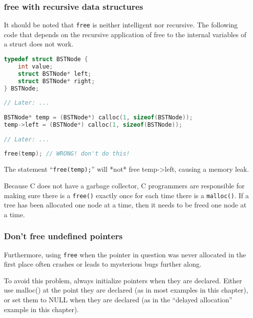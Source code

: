 \subsubsection{free with recursive data structures}
It should be noted that \texttt{free} is neither intelligent nor recursive. The
following code that depends on the recursive application of free to the
internal variables of a struct does not work.
\lstset{basicstyle=\scriptsize, numbers=left, captionpos=b, tabsize=4}
\begin{lstlisting}[caption=Section \thesection listing \arabic{memcnt},language={C},
breaklines=true,xleftmargin=15pt,label=lst:section\thesection listing\arabic{memcnt}]
typedef struct BSTNode {
	int value; 
	struct BSTNode* left;
	struct BSTNode* right;
} BSTNode;
 
// Later: ... 
 
BSTNode* temp = (BSTNode*) calloc(1, sizeof(BSTNode));
temp->left = (BSTNode*) calloc(1, sizeof(BSTNode));
 
// Later: ... 
 
free(temp); // WRONG! don't do this!
\end{lstlisting}

The statement ``\texttt{free(temp);}'' will *not* free temp-\textgreater{}left,
causing a memory leak.

Because C does not have a garbage collector, C programmers are responsible for
making sure there is a \texttt{free()} exactly once for each time there is a
\texttt{malloc()}.  If a tree has been allocated one node at a time, then it
needs to be freed one node at a time.

\subsubsection{Don't free undefined pointers}
Furthermore, using \texttt{free} when the pointer in question was never
allocated in the first place often crashes or leads to mysterious bugs further
along.

To avoid this problem, always initialize pointers when they are declared.
Either use malloc() at the point they are declared (as in most examples in this
chapter), or set them to NULL when they are declared (as in the ``delayed
allocation'' example in this chapter).
